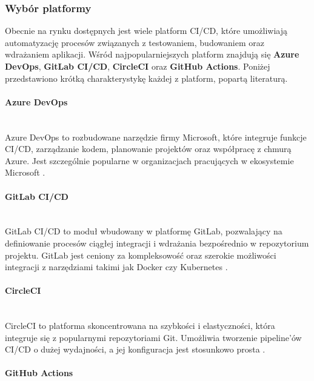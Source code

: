 \documentclass{article}
\begin{document}
\subsubsection{Wybór platformy}

Obecnie na rynku dostępnych jest wiele platform CI/CD, które umożliwiają automatyzację procesów związanych z testowaniem, budowaniem oraz wdrażaniem aplikacji. Wśród najpopularniejszych platform znajdują się \textbf{Azure DevOps}, \textbf{GitLab CI/CD}, \textbf{CircleCI} oraz \textbf{GitHub Actions}. Poniżej przedstawiono krótką charakterystykę każdej z platform, popartą literaturą.

\paragraph{Azure DevOps}\mbox{} \\

Azure DevOps to rozbudowane narzędzie firmy Microsoft, które integruje funkcje CI/CD, zarządzanie kodem, planowanie projektów oraz współpracę z chmurą Azure. Jest szczególnie popularne w organizacjach pracujących w ekosystemie Microsoft \cite{AzureDevOpsGitHubActionsComparison}.

\paragraph{GitLab CI/CD}\mbox{} \\

GitLab CI/CD to moduł wbudowany w platformę GitLab, pozwalający na definiowanie procesów ciągłej integracji i wdrażania bezpośrednio w repozytorium projektu. GitLab jest ceniony za kompleksowość oraz szerokie możliwości integracji z narzędziami takimi jak Docker czy Kubernetes \cite{GitLabAzureDevOpsComparison}.

\paragraph{CircleCI}\mbox{} \\

CircleCI to platforma skoncentrowana na szybkości i elastyczności, która integruje się z popularnymi repozytoriami Git. Umożliwia tworzenie pipeline'ów CI/CD o dużej wydajności, a jej konfiguracja jest stosunkowo prosta \cite{CircleCIGitHubActionsGitLab}.

\paragraph{GitHub Actions}\mbox{} \\
\end{document}
